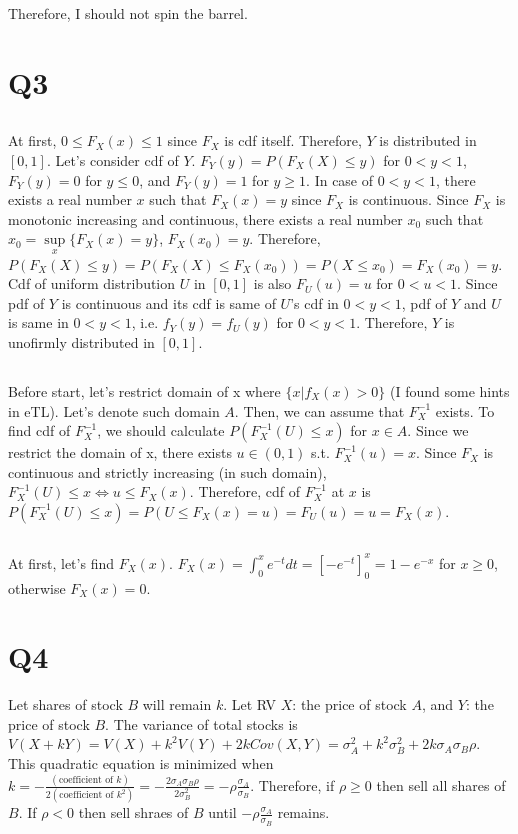 \documentclass{article}
\begin{document}
Therefore, I should not spin the barrel.

\section{Q3}

\subsection{}
At first, $0 \leq F_X(x) \leq 1$ since $F_X$ is cdf itself.
Therefore, $Y$ is distributed in $[0,1]$.
Let's consider cdf of $Y$.
$F_Y(y) = P(F_X(X) \leq y)$ for $0 < y < 1$, $F_Y(y) = 0$ for $y \leq 0$,
    and $F_Y(y) = 1$ for $y \geq 1$.
In case of $0 < y < 1$, there exists a real number $x$ such that $F_X(x)=y$
    since $F_X$ is continuous.
Since $F_X$ is monotonic increasing and continuous,
    there exists a real number $x_0$
    such that $x_0 = \sup\limits_{x}\{F_X(x)=y\}$, $F_X(x_0)=y$.
Therefore,
$P(F_X(X) \leq y)
= P(F_X(X) \leq F_X(x_0))
= P(X \leq x_0)
= F_X(x_0)
= y$.
Cdf of uniform distribution $U$ in $[0,1]$ is also $F_U(u)=u$ for $0 < u < 1$.
Since pdf of $Y$ is continuous and its cdf is same of $U$'s cdf in $0 < y < 1$,
    pdf of $Y$ and $U$ is same in $0 < y < 1$, i.e. $f_Y(y)=f_U(y)$ for $0 < y < 1$.
Therefore, $Y$ is unofirmly distributed in $[0,1]$.

\subsection{}
Before start, let's restrict domain of x where $\{x|f_X(x) > 0\}$ (I found some hints in eTL).
Let's denote such domain $A$.
Then, we can assume that $F_X^{-1}$ exists.
To find cdf of $F_X^{-1}$, we should calculate $P(F_X^{-1}(U) \leq x)$ for $x \in A$.
Since we restrict the domain of x, there exists $u \in (0,1)$ s.t. $F_X^{-1}(u)=x$.
Since $F_X$ is continuous and strictly increasing (in such domain),
    $F_X^{-1}(U) \leq x \iff u \leq F_X(x)$.
Therefore, cdf of $F_X^{-1}$ at $x$ is
$P(F_X^{-1}(U) \leq x)
= P(U \leq F_X(x) = u)
= F_U(u)
= u
= F_X(x)$.

\subsection{}
At first, let's find $F_X(x)$.
$F_X(x) = \int_{0}^{x}e^{-t}dt
= [-e^{-t}]_{0}^{x}
= 1 - e^{-x}$
for $x \geq 0$, otherwise $F_X(x)=0$.

\section{Q4}
Let shares of stock $B$ will remain $k$.
Let RV $X$: the price of stock $A$, and $Y$: the price of stock $B$.
The variance of total stocks is
$V(X+kY) = V(X) + k^2V(Y) + 2kCov(X,Y)
= \sigma_A^2 + k^2\sigma_B^2 + 2k\sigma_A\sigma_B\rho$.
This quadratic equation is minimized when
$k=-\frac{(\text{coefficient of }k)}{2(\text{coefficient of }k^2)}
=-\frac{2\sigma_A\sigma_B\rho}{2\sigma_B^2}
=-\rho\frac{\sigma_A}{\sigma_B}$.
Therefore, if $\rho \geq 0$ then sell all shares of $B$.
If $\rho < 0$ then sell shraes of $B$ until $-\rho\frac{\sigma_A}{\sigma_B}$ remains.
\end{document}
